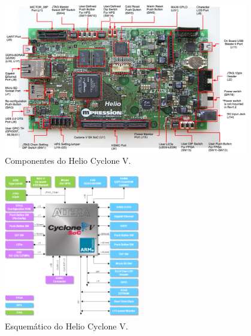 	\begin{frame}%
        \vspace{-0.5em}
		\begin{figure}[h]
			\centering
			\includegraphics[width=0.95\textwidth]{img/imobilis/helio-foto-2.png}
			\caption{Componentes do Helio Cyclone V.}
			\label{fig:helio-foto2}
		\end{figure}
	\end{frame}

	\begin{frame}%
		\begin{figure}[h]
			\centering
			\includegraphics[width=0.53\textwidth]{img/imobilis/helio-esquematico.png}
			\caption{Esquemático do Helio Cyclone V.}
			\label{fig:helio-esquematico}
		\end{figure}
	\end{frame}



